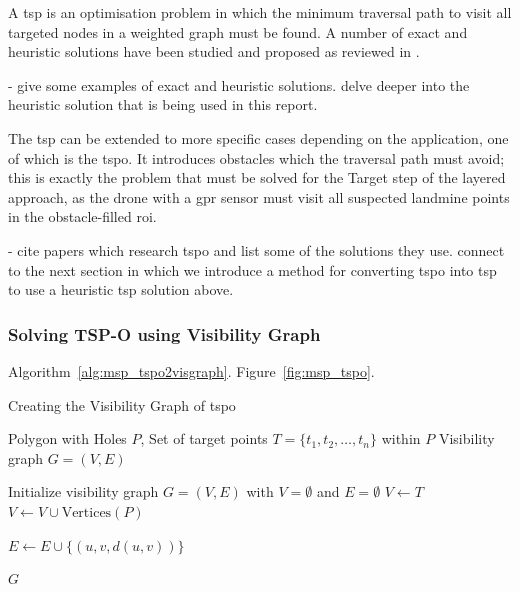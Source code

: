 A \gls{tsp} is an optimisation problem in which the minimum traversal path to visit all targeted nodes in a weighted graph must be found. A number of exact and heuristic solutions have been studied and proposed as reviewed in \cite{laporte1992tsp}. 

- give some examples of exact and heuristic solutions. delve deeper into the heuristic solution that is being used in this report. 

The \gls{tsp} can be extended to more specific cases depending on the application, one of which is the \gls{tspo}. It introduces obstacles which the traversal path must avoid; this is exactly the problem that must be solved for the Target step of the layered approach, as the drone with a \gls{gpr} sensor must visit all suspected landmine points in the obstacle-filled \gls{roi}.

- cite papers which research tspo and list some of the solutions they use. connect to the next section in which we introduce a method for converting tspo into tsp to use a heuristic tsp solution above. 

\subsubsection{Solving TSP-O using Visibility Graph}



Algorithm~\ref{alg:msp_tspo2visgraph}. Figure~\ref{fig:msp_tspo}.

\begin{algorithm}
\caption{Creating the Visibility Graph of \gls{tspo}}
\label{alg:msp_tspo2visgraph}
\begin{algorithmic}[1]
\Require Polygon with Holes $P$, Set of target points $T = \{t_1, t_2, \ldots, t_n\}$ within $P$
\Ensure Visibility graph $G = (V, E)$

\State Initialize visibility graph $G = (V, E)$ with $V = \emptyset$ and $E = \emptyset$
\State $V \leftarrow T$ 
\State $V \leftarrow V \cup \text{Vertices}(P)$ 

            \State $E \leftarrow E \cup \{(u, v, d(u, v))\}$ 
        \EndIf
    \EndFor
\EndFor

\Return $G$ 
\end{algorithmic}
\end{algorithm}


